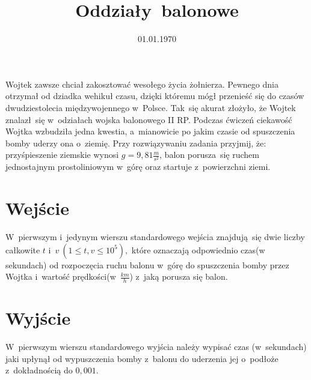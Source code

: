 \documentclass[zad]{soigstyl}
\date{01.01.1970}
\title{\mbox{Oddziały balonowe}}
\begin{document}
\begin{tasktext}%
    \noindent
    Wojtek zawsze chciał zakosztować wesołego życia żołnierza. Pewnego dnia otrzymał od dziadka wehikuł czasu, dzięki któremu mógł przenieść się do czasów dwudziestolecia międzywojennego w~Polsce. Tak~się akurat złożyło, że Wojtek znalazł~się w~odziałach wojska balonowego II RP. Podczas ćwiczeń ciekawość Wojtka wzbudziła jedna kwestia, a~mianowicie po jakim czasie od spuszczenia bomby uderzy ona o~ziemię. Przy rozwiązywaniu zadania przyjmij, że: przyśpieszenie ziemskie wynosi $g = 9,81 \frac{m}{s^2}$, balon porusza~się ruchem jednostajnym prostoliniowym w~górę oraz startuje z~powierzchni ziemi.
	
    	\section{Wejście}
	W~pierwszym i~jedynym wierszu standardowego wejścia znajdują~się dwie liczby całkowite $t$ i~$v~(1 \leqslant t, v \leqslant 10^5),$ które oznaczają odpowiednio czas(w sekundach) od rozpoczęcia ruchu balonu w~górę do spuszczenia bomby przez Wojtka i~wartość prędkości(w~$\frac{km}{h}$) z~jaką porusza się balon.

	\section{Wyjście}
	W~pierwszym wierszu standardowego wyjścia należy wypisać czas (w~sekundach) jaki upłynął od wypuszczenia bomby z~balonu do uderzenia jej o~podłoże z~dokładnością do $0,001$.
	
	\oigprzyklady
\end{tasktext}
\end{document}
